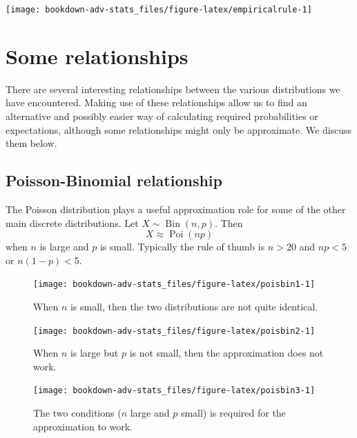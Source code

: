 \documentclass[
]{book}
\DeclareMathOperator{\Bin}{Bin}
\DeclareMathOperator{\Pois}{Poi}
\theoremstyle{definition}
\theoremstyle{definition}
\theoremstyle{definition}
\theoremstyle{definition}
\theoremstyle{remark}
\begin{document}
\begin{center}\texttt{[image: bookdown-adv-stats\_files/figure-latex/empiricalrule-1]} \end{center}

\hypertarget{some-relationships}{%
\section{Some relationships}\label{some-relationships}}

There are several interesting relationships between the various distributions we have encountered.
Making use of these relationships allow us to find an alternative and possibly easier way of calculating required probabilities or expectations, although some relationships might only be approximate.
We discuss them below.

\hypertarget{poisson-binomial-relationship}{%
\subsection{Poisson-Binomial relationship}\label{poisson-binomial-relationship}}

The Poisson distribution plays a useful approximation role for some of the other main discrete distributions.
Let \(X\sim\Bin(n,p)\).
Then
\[
X \approx \Pois(np)
\]
when \(n\) is large and \(p\) is small.
Typically the rule of thumb is \(n>20\) and \(np<5\) or \(n(1-p)<5\).

\begin{figure}

{\centering \texttt{[image: bookdown-adv-stats\_files/figure-latex/poisbin1-1]} 

}

\caption{When \(n\) is small, then the two distributions are not quite identical.}\label{fig:poisbin1}
\end{figure}

\begin{figure}

{\centering \texttt{[image: bookdown-adv-stats\_files/figure-latex/poisbin2-1]} 

}

\caption{When \(n\) is large but \(p\) is not small, then the approximation does not work.}\label{fig:poisbin2}
\end{figure}

\begin{figure}

{\centering \texttt{[image: bookdown-adv-stats\_files/figure-latex/poisbin3-1]} 

}

\caption{The two conditions (\(n\) large and \(p\) small) is required for the approximation to work.}\label{fig:poisbin3}
\end{figure}
\end{document}
